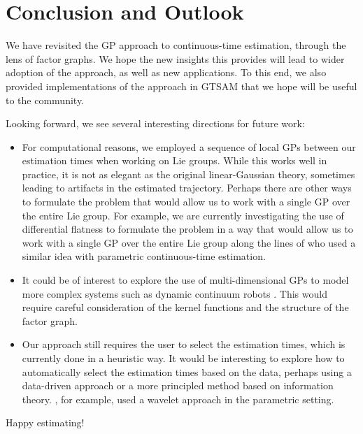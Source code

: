 
\chapter{Conclusion and Outlook}

We have revisited the \ac{GP} approach to continuous-time estimation, through the lens of factor graphs.  We hope the new insights this provides will lead to wider adoption of the approach, as well as new applications.  To this end, we also provided implementations of the approach in \ac{GTSAM} that we hope will be useful to the community.

Looking forward, we see several interesting directions for future work:
\begin{itemize}
\item For computational reasons, we employed a sequence of local \acp{GP} between our estimation times when working on Lie groups.  While this works well in practice, it is not as elegant as the original linear-Gaussian theory, sometimes leading to artifacts in the estimated trajectory.  Perhaps there are other ways to formulate the problem that would allow us to work with a single \ac{GP} over the entire Lie group.  For example, we are currently investigating the use of differential flatness to formulate the problem in a way that would allow us to work with a single \ac{GP} over the entire Lie group along the lines of \citet{johnsonContinuousTimeTrajectoryEstimation2023} who used a similar idea with parametric continuous-time estimation.
\item It could be of interest to explore the use of multi-dimensional \acp{GP} to model more complex systems such as dynamic continuum robots \citep{teetaert_icra24}.  This would require careful consideration of the kernel functions and the structure of the factor graph.
\item Our approach still requires the user to select the estimation times, which is currently done in a heuristic way.  It would be interesting to explore how to automatically select the estimation times  based on the data, perhaps using a data-driven approach or a more principled method based on information theory.  \citet{anderson_icra14}, for example, used a wavelet approach in the parametric setting.
\end{itemize}
Happy estimating!